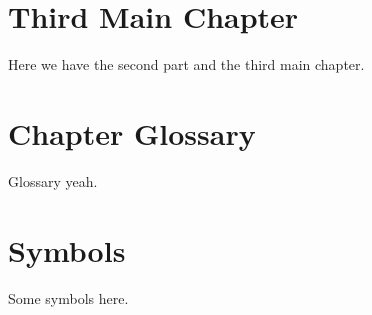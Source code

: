 \documentclass[openany]{book}
\begin{document}
    \chapter{Third Main Chapter}
    Here we have the second part and the third main chapter.
    \appendix
    \cleardoublepage
    \chapter{Chapter Glossary}
    Glossary yeah.
    \chapter{Symbols}
    Some symbols here.

    \clearpage

    \printindex
\end{document}
